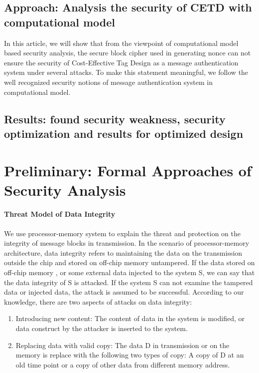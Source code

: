 \documentclass{article}
\begin{document}
\subsection{Approach: Analysis the security of CETD with computational model}
In this article, we will show that from the viewpoint of computational model based security analysis, the secure block cipher used in generating nonce can not ensure the security of Cost-Effective Tag Design as a message authentication system under several attacks. To make this statement meaningful, we follow the well recognized security notions of message authentication system in computational model.
\subsection{Results: found security weakness, security optimization and results for optimized design }

\section{Preliminary: Formal Approaches of Security Analysis}
\paragraph{Threat Model of Data Integrity}
We use processor-memory system to explain the threat and protection on the integrity of message blocks in transmission. 
In the scenario of processor-memory architecture, data integrity refers to maintaining the data on the transmission outside the chip and stored on off-chip memory untampered. If the data stored on off-chip memory , or some external data injected to the system S, we can say that the data integrity of S is attacked. If the system S can not examine the tampered data or injected data, the attack is assumed to be successful. According to our knowledge, there are two aspects of attacks on data integrity:
\begin{enumerate}
	\item Introducing new content: The content of data in the system is modified, or data construct by the attacker is inserted to the system.
	\item Replacing data with valid copy: The data D in transmission or on the memory is replace with the following two types of copy: A copy of D at an old time point or a copy of other data from different memory address.
\end{enumerate}
\end{document}
